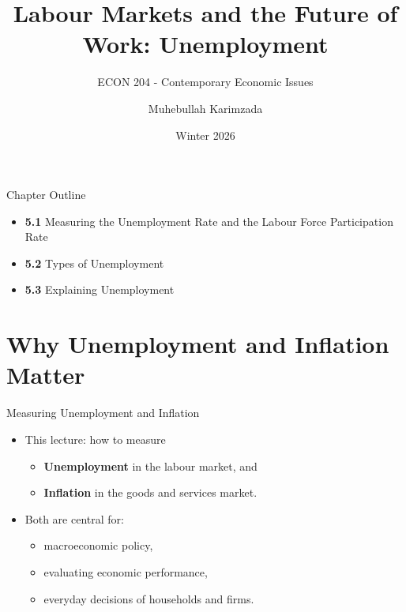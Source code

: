 \documentclass[aspectratio=169]{beamer}
\title{\textbf{Labour Markets and the Future of Work: Unemployment \vspace{.5cm}\\  }}
\subtitle{ {\large ECON 204 - Contemporary Economic Issues}}
\author{Muhebullah Karimzada}
\date{Winter 2026}
\begin{document}
\begin{frame}[plain]
  \titlepage
\end{frame}

\begin{frame}{Chapter Outline}
\transfade
\begin{itemize}
  \item \textbf{5.1} Measuring the Unemployment Rate and the Labour Force Participation Rate
  \item \textbf{5.2} Types of Unemployment
  \item \textbf{5.3} Explaining Unemployment

\end{itemize}
\end{frame}

\section*{Why Unemployment and Inflation Matter}

\begin{frame}{Measuring Unemployment and Inflation}
\transfade
\begin{itemize}

  \item This lecture: how to measure
  \begin{itemize}
    \item \textbf{Unemployment} in the labour market, and
    \item \textbf{Inflation} in the goods and services market.
  \end{itemize}
  \item Both are central for:
  \begin{itemize}
    \item macroeconomic policy,
    \item evaluating economic performance,
    \item everyday decisions of households and firms.
  \end{itemize}
\end{itemize}
\end{frame}

\end{document}
